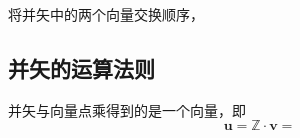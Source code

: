 \newpage

将并矢中的两个向量交换顺序，
\subsection{并矢的运算法则}
\sssection[并矢与向量点乘]

并矢与向量点乘得到的是一个向量，即
\begin{equation}
	\bm{u} = \mathbb{Z} \cdot \bm{v} = 
\end{equation}





